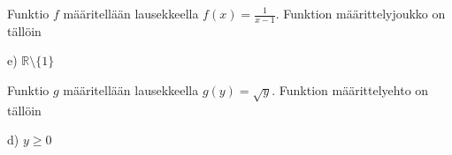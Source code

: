 
\begin{tehtava}
Funktio $f$ määritellään lausekkeella $f(x)=\frac{1}{x-1}$. Funktion määrittelyjoukko on tällöin
    \begin{vastaus}
	 e) $\mathbb{R}\setminus \lbrace 1 \rbrace$
    \end{vastaus}
\end{tehtava}

\begin{tehtava}
Funktio $g$ määritellään lausekkeella $g(y)=\sqrt{y}$. Funktion määrittelyehto on tällöin
    \begin{vastaus}
	 d) $y\geq 0$
    \end{vastaus}
\end{tehtava}

\newpage